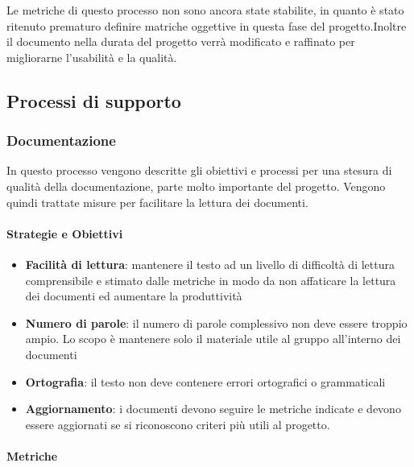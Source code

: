         Le metriche di questo processo non sono ancora state stabilite, in quanto è stato ritenuto prematuro definire matriche oggettive in questa fase del progetto.Inoltre il documento nella durata del progetto verrà modificato e raffinato per migliorarne l'usabilità e la qualità.
        
        
        
        \subsection{Processi di supporto}
            \subsubsection{Documentazione}
            In questo processo vengono descritte gli obiettivi e processi per una stesura di qualità della documentazione, parte molto importante del progetto. Vengono quindi trattate misure per facilitare la lettura dei documenti.
            
            \paragraph{Strategie e Obiettivi}
            \begin{itemize}
                \item \textbf{Facilità di lettura}: mantenere il testo ad un livello di difficoltà di lettura comprensibile e stimato dalle metriche in modo da non affaticare la lettura dei documenti ed aumentare la produttività
                \item \textbf{Numero di parole}: il numero di parole complessivo non deve essere troppio ampio. Lo scopo è mantenere solo il materiale utile al gruppo all'interno dei documenti
                \item \textbf{Ortografia}: il testo non deve contenere errori ortografici o grammaticali
                \item \textbf{Aggiornamento}: i documenti devono seguire le metriche indicate e devono essere aggiornati se si riconoscono criteri più utili al progetto.
            \end{itemize}
    \newpage
            \paragraph{Metriche}
            
